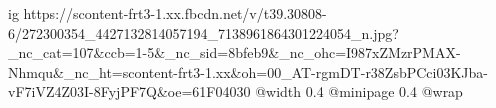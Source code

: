  
 
 
 
 

\ifcmt
  ig https://scontent-frt3-1.xx.fbcdn.net/v/t39.30808-6/272300354_4427132814057194_7138961864301224054_n.jpg?_nc_cat=107&ccb=1-5&_nc_sid=8bfeb9&_nc_ohc=I987xZMzrPMAX-Nhmqu&_nc_ht=scontent-frt3-1.xx&oh=00_AT-rgmDT-r38ZsbPCci03KJba-vF7iVZ4Z03I-8FyjPF7Q&oe=61F04030
  @width 0.4
  @minipage 0.4
  @wrap \parpic[r]
\fi
